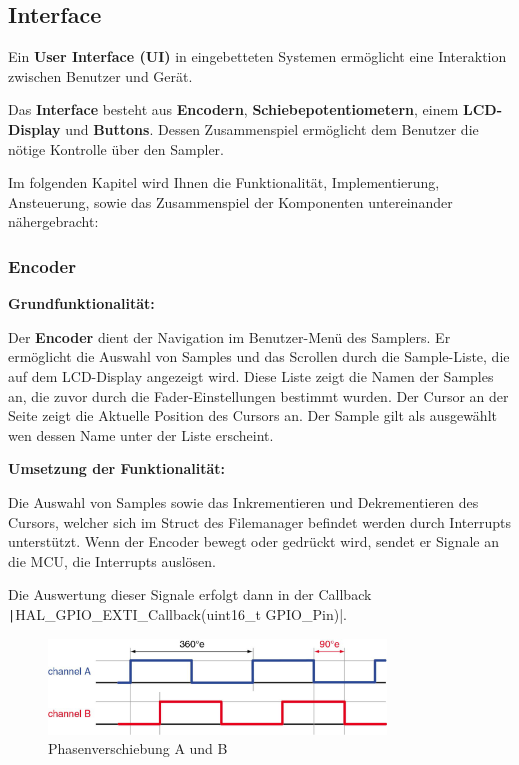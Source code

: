 \subsection{Interface}

Ein\textbf{ User Interface (UI)} in eingebetteten Systemen ermöglicht eine Interaktion zwischen Benutzer und Gerät.

Das \textbf{Interface} besteht aus \textbf{Encodern}, \textbf{Schiebepotentiometern}, einem \textbf{LCD-Display }und \textbf{Buttons}. Dessen Zusammenspiel ermöglicht dem Benutzer die nötige Kontrolle über den Sampler.


Im folgenden Kapitel wird Ihnen die Funktionalität, Implementierung, Ansteuerung, sowie das Zusammenspiel der Komponenten untereinander nähergebracht: 

\subsubsection{Encoder}

\textbf{Grundfunktionalität:}


Der \textbf{Encoder} dient der Navigation im Benutzer-Menü des Samplers. Er ermöglicht die Auswahl von Samples und das Scrollen durch die Sample-Liste, die auf dem LCD-Display angezeigt wird. Diese Liste zeigt die Namen der Samples an, die zuvor durch die Fader-Einstellungen bestimmt wurden. Der Cursor an der Seite zeigt die Aktuelle Position des Cursors an. Der Sample gilt als ausgewählt wen dessen Name unter der Liste erscheint.

\textbf{Umsetzung der Funktionalität:}

Die Auswahl von Samples sowie das Inkrementieren und Dekrementieren des Cursors, welcher sich im Struct des Filemanager befindet werden durch Interrupts unterstützt. Wenn der Encoder bewegt oder gedrückt wird, sendet er Signale an die MCU, die Interrupts auslösen.

Die Auswertung dieser Signale erfolgt dann in der Callback  \texttt|HAL_GPIO_EXTI_Callback(uint16_t GPIO_Pin)|. 

\begin{figure}[H]
	\centering
	\includegraphics[width=0.8\textwidth]{images/08_durchfuehrung/interface/encoder.png}
	\caption{Phasenverschiebung A und B}
	\label{fig:phase_verschiebung}
\end{figure}

